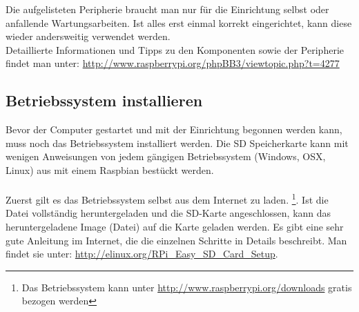 Die aufgelisteten Peripherie braucht man nur für die Einrichtung selbst oder anfallende Wartungsarbeiten.
Ist alles erst einmal korrekt eingerichtet, kann diese wieder andersweitig verwendet werden.
\\
Detaillierte Informationen und Tipps zu den Komponenten sowie der Peripherie findet man unter: \url{http://www.raspberrypi.org/phpBB3/viewtopic.php?t=4277}

\subsection{Betriebssystem installieren}
Bevor der Computer gestartet und mit der Einrichtung begonnen werden kann, muss noch das Betriebssystem installiert werden.
Die SD Speicherkarte kann mit wenigen Anweisungen von jedem gängigen Betriebssystem (Windows, OSX, Linux) aus mit einem Raspbian bestückt werden.
\\
\\
Zuerst gilt es das Betriebssystem selbst aus dem Internet zu laden.
\footnote{Das Betriebssystem kann unter \url{http://www.raspberrypi.org/downloads} gratis bezogen werden}.
Ist die Datei vollständig heruntergeladen und die SD-Karte angeschlossen, kann das heruntergeladene Image (Datei) auf die Karte geladen werden.
Es gibt eine sehr gute Anleitung im Internet, die die einzelnen Schritte in Details beschreibt. Man findet sie unter: \url{http://elinux.org/RPi\_Easy\_SD\_Card\_Setup}.
